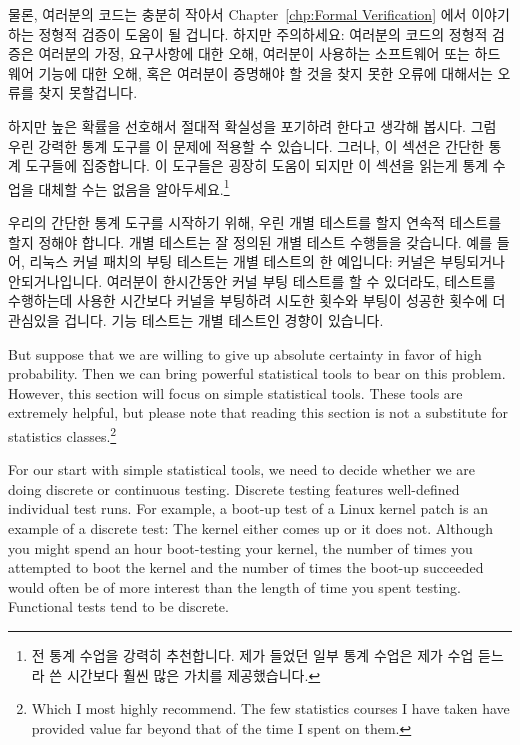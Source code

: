 {	\fi

	물론, 여러분의 코드는 충분히 작아서
	Chapter~\ref{chp:Formal Verification} 에서 이야기하는 정형적 검증이
	도움이 될 겁니다.
	하지만 주의하세요: 여러분의 코드의 정형적 검증은 여러분의 가정,
	요구사항에 대한 오해, 여러분이 사용하는 소프트웨어 또는 하드웨어 기능에
	대한 오해, 혹은 여러분이 증명해야 할 것을 찾지 못한 오류에 대해서는
	오류를 찾지 못할겁니다.

}\QuickQuizEnd

하지만 높은 확률을 선호해서 절대적 확실성을 포기하려 한다고 생각해 봅시다.
그럼 우린 강력한 통계 도구를 이 문제에 적용할 수 있습니다.
그러나, 이 섹션은 간단한 통계 도구들에 집중합니다.
이 도구들은 굉장히 도움이 되지만 이 섹션을 읽는게 통계 수업을 대체할 수는
없음을 알아두세요.\footnote{
	전 통계 수업을 강력히 추천합니다.
	제가 들었던 일부 통계 수업은 제가 수업 듣느라 쓴 시간보다 훨씬 많은
	가치를 제공했습니다.}

우리의 간단한 통계 도구를 시작하기 위해, 우린 개별 테스트를 할지 연속적
테스트를 할지 정해야 합니다.
개별 테스트는 잘 정의된 개별 테스트 수행들을 갖습니다.
예를 들어, 리눅스 커널 패치의 부팅 테스트는 개별 테스트의 한 예입니다:
커널은 부팅되거나 안되거나입니다.
여러분이 한시간동안 커널 부팅 테스트를 할 수 있더라도, 테스트를 수행하는데
사용한 시간보다 커널을 부팅하려 시도한 횟수와 부팅이 성공한 횟수에 더 관심있을
겁니다.
기능 테스트는 개별 테스트인 경향이 있습니다.

\iffalse

But suppose that we are willing to give up absolute certainty in favor
of high probability.
Then we can bring powerful statistical tools to bear on this problem.
However, this section will focus on simple statistical tools.
These tools are extremely helpful, but please note that reading this
section is not a substitute for statistics classes.\footnote{
	Which I most highly recommend.
	The few statistics courses I have taken have provided value
	far beyond that of the time I spent on them.}

For our start with simple statistical tools, we need to decide whether
we are doing discrete or continuous testing.
Discrete testing features well-defined individual test runs.
For example, a boot-up test of a Linux kernel patch is an example
of a discrete test:
The kernel either comes up or it does not.
Although you might spend an hour boot-testing your kernel, the number of
times you attempted to boot the kernel and the number of times the
boot-up succeeded would often be of more interest than the length
of time you spent testing.
Functional tests tend to be discrete.

